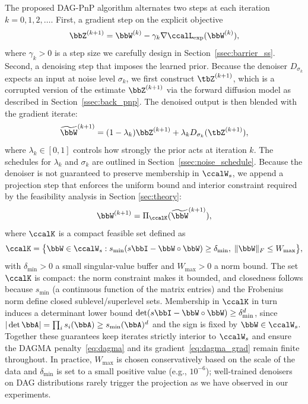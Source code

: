 \documentclass[conference]{IEEEtran}
\newcommand{\Lext}{\ccalL_{\mathrm{exp}}}
\begin{document}
	The proposed DAG-PnP algorithm alternates two steps at each iteration 
    $k=0,1,2,\ldots$.
    First, a gradient step on the explicit objective
    \begin{equation}\label{eq:grad_step}
        \bbZ^{(k+1)} = \bbW^{(k)} - \gamma_k \nabla \Lext(\bbW^{(k)}),
    \end{equation}
    where $\gamma_k > 0$ is a step size we carefully design in 
    Section~\ref{ssec:barrier_ss}. 
    Second, a denoising step that imposes the learned prior. 
    Because the denoiser $D_{\sigma_k}$ expects an input at noise level $\sigma_k$, we first construct $\tbZ^{(k+1)}$, which is a corrupted version of the estimate $\bbZ^{(k+1)}$ via the forward diffusion model as described in Section~\ref{ssec:back_pnp}.
    The denoised output is then blended with the gradient iterate:
    \begin{equation}\label{eq:denoise_step}
        \widetilde{\bbW}^{(k+1)} = (1-\lambda_k)\bbZ^{(k+1)} 
        + \lambda_k D_{\sigma_k}(\tbZ^{(k+1)}),
    \end{equation}
    where $\lambda_k \in [0,1]$ controls how strongly the prior acts 
    at iteration $k$. The schedules for $\lambda_k$ and $\sigma_k$ are 
    outlined in Section~\ref{ssec:noise_schedule}.
	Because the denoiser is not guaranteed to preserve membership in $\ccalW_s$, we append a projection step that enforces the uniform bound and interior constraint required by the feasibility analysis in Section \ref{sec:theory}:
	\begin{equation}\label{eq:proj_step}
		\bbW^{(k+1)} = \Pi_{\ccalK}(\widetilde{\bbW}^{(k+1)}),
	\end{equation}
	where $\ccalK$ is a compact feasible set defined as
    \begin{equation}\label{eq:calK}
		 \ccalK = \big\{ \bbW \in \ccalW_s : s_{\min}(s\bbI - \bbW \circ \bbW) \geq \delta_{\min},\; \|\bbW\|_F \leq W_{\max}\big\},
	\end{equation}
	with $\delta_{\min} > 0$ a small singular-value buffer and $W_{\max} > 0$ a norm bound. The set $\ccalK$ is compact: the norm constraint makes it bounded, and closedness follows because $s_{\min}$ (a continuous function of the matrix entries) and the Frobenius norm define closed sublevel/superlevel sets. Membership in $\ccalK$ in turn induces a determinant lower bound $\det(s\bbI - \bbW \circ \bbW) \geq \delta_{\min}^d$, since $|\det \bbA| = \prod_i s_i(\bbA) \geq s_{\min}(\bbA)^d$ and the sign is fixed by $\bbW \in \ccalW_s$. Together these guarantees keep iterates strictly interior to $\ccalW_s$ and ensure the DAGMA penalty~\eqref{eq:dagma} and its gradient~\eqref{eq:dagma_grad} remain finite throughout. In practice, $W_{\max}$ is chosen conservatively based on the scale of the data and $\delta_{\min}$ is set to a small positive value (e.g., $10^{-6}$); well-trained denoisers on DAG distributions rarely trigger the projection as we have observed in our experiments.
\end{document}

